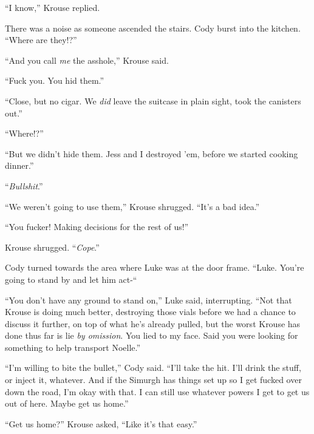 ``I know,'' Krouse replied.



There was a noise as someone ascended the stairs.  Cody burst into the kitchen.  ``Where are they!?''



``And you call \emph{me} the asshole,'' Krouse said.



``Fuck you.  You hid them.''



``Close, but no cigar.  We \emph{did} leave the suitcase in plain sight, took the canisters out.''



``Where!?''



``But we didn't hide them.  Jess and I destroyed 'em, before we started cooking dinner.''



``\emph{Bullshit}.''



``We weren't going to use them,'' Krouse shrugged.  ``It's a bad idea.''



``You fucker!  Making decisions for the rest of us!''



Krouse shrugged.  ``\emph{Cope}.''



Cody turned towards the area where Luke was at the door frame.  ``Luke.  You're going to stand by and let him act-``



``You don't have any ground to stand on,'' Luke said, interrupting.  ``Not that Krouse is doing much better, destroying those vials before we had a chance to discuss it further, on top of what he's already pulled, but the worst Krouse has done thus far is lie \emph{by omission}.  You lied to my face.  Said you were looking for something to help transport Noelle.''



``I'm willing to bite the bullet,'' Cody said.  ``I'll take the hit.  I'll drink the stuff, or inject it, whatever.  And if the Simurgh has things set up so I get fucked over down the road, I'm okay with that.  I can still use whatever powers I get to get us out of here.  Maybe get us home.''



``Get us home?'' Krouse asked, ``Like it's that easy.''



